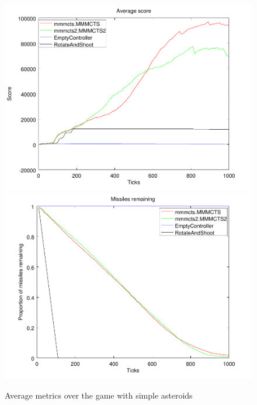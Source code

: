 \begin{figure}
	\caption{Average metrics over the game with simple asteroids}
	\center
	\includegraphics[scale=0.25]{resources/score_1.pdf}
	\includegraphics[scale=0.25]{resources/missiles_1.pdf}
\end{figure}

